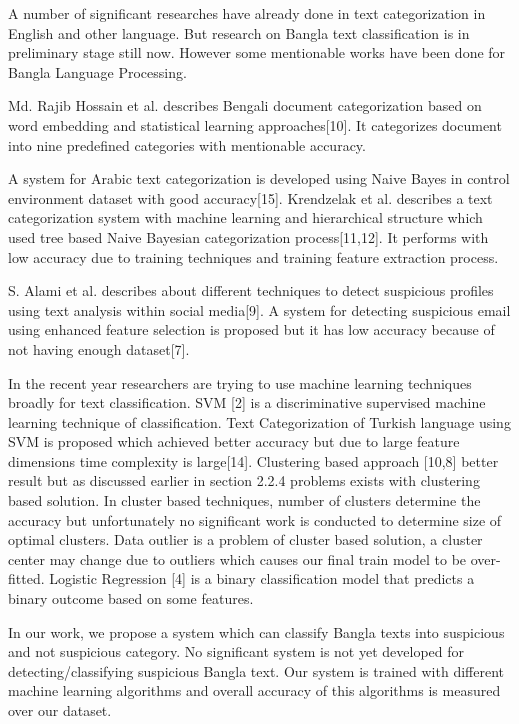 \documentclass[12pt,a4paper]{report}
\begin{document}
A number of significant researches have already done in text categorization in English and other language. But research on Bangla text classification is in preliminary stage still now. However some mentionable works have been done for Bangla Language Processing.
\par
\vspace{0.5cm}
 Md. Rajib Hossain et al. describes Bengali document categorization based on word embedding and statistical learning approaches[10]. It categorizes document into nine predefined categories with mentionable accuracy.\par 
 A system for Arabic text categorization is developed using Naive Bayes in control environment dataset with good accuracy[15]. Krendzelak et al. describes a text categorization system with machine learning and hierarchical structure which used tree based Naive Bayesian categorization process[11,12]. It performs with low accuracy due to training techniques and training feature extraction process.\par
 S. Alami et al. describes about different techniques to detect suspicious profiles using text analysis within social media[9]. A system for detecting suspicious email using enhanced feature selection is proposed but it has low accuracy because of not having enough dataset[7].
 \par 
 In the recent year researchers are trying to use machine learning techniques broadly for text classification. SVM [2] is a discriminative supervised machine learning technique of classification. Text Categorization of Turkish language using SVM is proposed which achieved better accuracy but due to large feature dimensions time complexity is large[14]. Clustering based approach [10,8] better result but as discussed earlier in section 2.2.4 problems exists with clustering based solution. In cluster based techniques, number of clusters determine the accuracy but unfortunately no significant work is conducted to determine size of optimal clusters. Data outlier is a problem of cluster based solution, a cluster center may change due to outliers which causes our final train model to be over-fitted. Logistic Regression [4] is a binary classification model that predicts a binary outcome based on some features. \par 
 In our work, we propose a system which can classify Bangla texts into suspicious and not suspicious category. No significant system is not yet developed for detecting/classifying suspicious Bangla text. Our system is trained with different machine learning algorithms and overall accuracy of this algorithms is measured over our dataset.        
 
\end{document}
